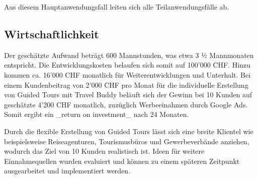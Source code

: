 Aus diesem Hauptanwendungsfall leiten sich alle Teilanwendungsfälle ab.

\subsection{Wirtschaftlichkeit}\label{Wirtschaftlichkeit}
Der geschätzte Aufwand beträgt 600 Mannstunden, was etwa 3 ½ Mannmonaten entspricht. Die Entwicklungskosten belaufen sich somit auf 100'000 CHF. Hinzu kommen ca. 16'000 CHF monatlich für Weiterentwicklungen und Unterhalt. Bei einem Kundenbeitrag von 2'000 CHF pro Monat für die individuelle Erstellung von Guided Tours mit Travel Buddy beläuft sich der Gewinn bei 10 Kunden auf geschätzte 4'200 CHF monatlich, zuzüglich Werbeeinahmen durch Google Ads. Somit ergibt ein _return on investment_ nach 24 Monaten.

Durch die flexible Erstellung von Guided Tours lässt sich eine breite Klientel wie beispielsweise Reiseagenturen, Tourismusbüros und Gewerbeverbände  anziehen, wodurch das Ziel von 10 Kunden realistisch ist. Ideen für weitere Einnahmequellen wurden evaluiert und können zu einem späteren Zeitpunkt ausgearbeitet und implementiert werden.


